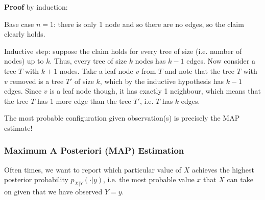 \textbf{Proof} by induction:

Base case $n = 1$: there is only 1 node and so there are no edges, so the claim clearly holds.

Inductive step: suppose the claim holds for every tree of size (i.e. number of nodes) up to $k$. Thus, every tree of size $k$ nodes has $k - 1$ edges. Now consider a tree $T$ with $k + 1$ nodes. Take a leaf node $v$ from $T$ and note that the tree $T$ with $v$ removed is a tree $T'$ of size $k$, which by the inductive hypothesis has $k - 1$ edges. Since $v$ is a leaf node though, it has exactly 1 neighbour, which means that the tree $T$ has 1 more edge than the tree $T'$, i.e. $T$ has $k$ edges.


The most probable configuration given observation(s) is precisely the MAP estimate!

\subsubsection{Maximum A Posteriori (MAP) Estimation}

Often times, we want to report which particular value of $X$ achieves the highest posterior probability $p_{X|Y}(\cdot | y)$, i.e. the most probable value $x$ that $X$ can take on given that we have observed $Y = y$.

